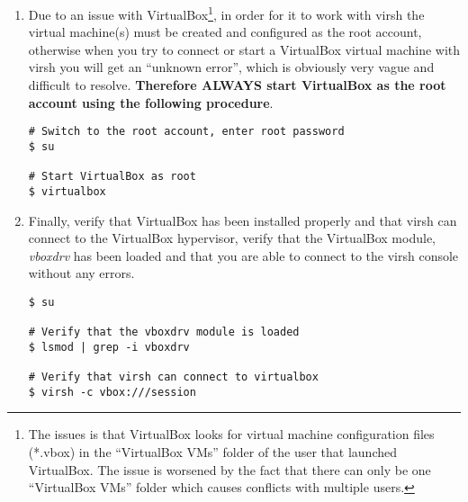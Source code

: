 \begin{enumerate}
\item	Due to an issue with VirtualBox\footnote{The issues is that VirtualBox looks for virtual machine configuration files (*.vbox)
		in the ``VirtualBox VMs'' folder of the user that launched VirtualBox. The issue is worsened by the fact that there can
		only be one ``VirtualBox VMs'' folder which causes conflicts with multiple users.}, in order for it to work with virsh 
		the virtual machine(s) must be created and configured as the root account, otherwise when you try to connect or start a 
		VirtualBox virtual machine with virsh you will get an ``unknown error'', which is obviously very vague and difficult to 
		resolve. {\bf Therefore ALWAYS start VirtualBox as the root account using the following procedure}.

\lstset{language=bash,caption=Always Start VirtualBox as Root}
\begin{lstlisting}
# Switch to the root account, enter root password
$ su

# Start VirtualBox as root
$ virtualbox
\end{lstlisting}

\item	Finally, verify that VirtualBox has been installed properly and that virsh can connect to the VirtualBox hypervisor, 
		verify that the VirtualBox module, \emph{vboxdrv} has been loaded and that you are able to connect to the virsh console 
		without any errors.

\lstset{language=bash,caption=Verify that virsh can Access VirtualBox}
\begin{lstlisting}
$ su

# Verify that the vboxdrv module is loaded
$ lsmod | grep -i vboxdrv

# Verify that virsh can connect to virtualbox
$ virsh -c vbox:///session
\end{lstlisting}
\end{enumerate}




